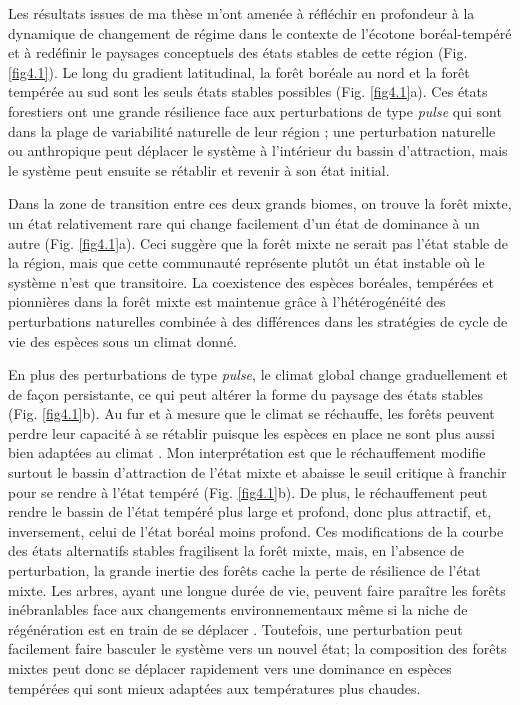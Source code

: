 Les résultats issues de ma thèse m'ont amenée à réfléchir en profondeur
à la dynamique de changement de régime dans le contexte de l'écotone
boréal-tempéré et à redéfinir le paysages conceptuels des états stables
de cette région (Fig. \ref{fig4.1}). Le long du gradient latitudinal, la
forêt boréale au nord et la forêt tempérée au sud sont les seuls états
stables possibles (Fig. \ref{fig4.1}a). Ces états forestiers ont une
grande résilience face aux perturbations de type \emph{pulse} qui sont
dans la plage de variabilité naturelle de leur région
\citep{grondin_have_2018}; une perturbation naturelle ou anthropique
peut déplacer le système à l'intérieur du bassin d'attraction, mais le
système peut ensuite se rétablir et revenir à son état initial.

Dans la zone de transition entre ces deux grands biomes, on trouve la
forêt mixte, un état relativement rare qui change facilement d'un état
de dominance à un autre (Fig. \ref{fig4.1}a). Ceci suggère que la forêt
mixte ne serait pas l'état stable de la région, mais que cette
communauté représente plutôt un état instable où le système n'est que
transitoire. La coexistence des espèces boréales, tempérées et
pionnières dans la forêt mixte est maintenue grâce à l'hétérogénéité des
perturbations naturelles combinée à des différences dans les stratégies
de cycle de vie des espèces
\citep{kneeshaw_natural_2007, bouchard_tree_2006} sous un climat donné.

En plus des perturbations de type \emph{pulse}, le climat global change
graduellement et de façon persistante, ce qui peut altérer la forme du
paysage des états stables (Fig. \ref{fig4.1}b). Au fur et à mesure que
le climat se réchauffe, les forêts peuvent perdre leur capacité à se
rétablir puisque les espèces en place ne sont plus aussi bien adaptées
au climat \citep{johnstone_changing_2016}. Mon interprétation est que le
réchauffement modifie surtout le bassin d'attraction de l'état mixte et
abaisse le seuil critique à franchir pour se rendre à l'état tempéré
(Fig. \ref{fig4.1}b). De plus, le réchauffement peut rendre le bassin de
l'état tempéré plus large et profond, donc plus attractif, et,
inversement, celui de l'état boréal moins profond. Ces modifications de
la courbe des états alternatifs stables fragilisent la forêt mixte,
mais, en l'absence de perturbation, la grande inertie des forêts cache
la perte de résilience de l'état mixte. Les arbres, ayant une longue
durée de vie, peuvent faire paraître les forêts inébranlables face aux
changements environnementaux même si la niche de régénération est en
train de se déplacer
\citep{sittaro_tree_2017, boisvertmarsh_divergent_2019}. Toutefois, une
perturbation peut facilement faire basculer le système vers un nouvel
état; la composition des forêts mixtes peut donc se déplacer rapidement
vers une dominance en espèces tempérées qui sont mieux adaptées aux
températures plus chaudes.

